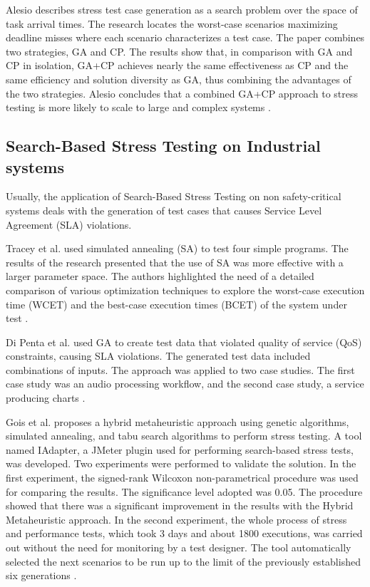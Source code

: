 \documentclass{report}
\begin{document}
Alesio describes stress test case generation as a search problem over the space of task arrival times. The research locates the  worst-case scenarios maximizing deadline misses where each scenario characterizes a test case. The paper combines two strategies, GA and CP. The results show that, in comparison with GA and CP in isolation, GA+CP achieves nearly the same effectiveness as CP and the same efficiency and solution diversity as GA, thus combining the advantages of the two strategies. Alesio concludes that a combined GA+CP approach to stress testing is more likely to scale to large and complex systems \cite{Alesio2015}.

\subsection{Search-Based Stress Testing on Industrial systems}

Usually, the application of Search-Based Stress Testing on non safety-critical systems deals with the generation of test cases that causes Service Level Agreement (SLA) violations.


Tracey et al. \cite{Tracey1998} used simulated annealing (SA) to test four
simple programs. The results of the research presented that the use of SA was more effective with a larger parameter space. The authors highlighted the need of a detailed comparison of various optimization techniques to explore the worst-case execution time (WCET) and the best-case execution times (BCET) of the system under test \cite{Tracey1998}.

Di Penta et al. \cite{Penta2007} used GA to create test data that violated quality of service (QoS) constraints, causing SLA violations. The generated test data included combinations of inputs. The approach was applied to two case studies. The first case study was an audio processing workflow, and the second case study, a service producing charts \cite{Penta2007}.


Gois et al. proposes a hybrid metaheuristic approach using genetic algorithms, simulated annealing, and tabu search algorithms to perform stress testing. A tool named IAdapter, a JMeter plugin used for performing search-based stress tests, was developed. Two experiments were performed to validate the solution. In the first experiment, the signed-rank Wilcoxon non-parametrical procedure was used for comparing the results. The significance level adopted was 0.05. The procedure showed that there was a significant improvement in the results with the Hybrid Metaheuristic approach.
In the second experiment, the whole process of stress and performance tests, which took 3 days and about 1800 executions, was carried out without the need for monitoring by a test designer. The tool automatically selected the next scenarios to be run up to the limit of the previously established six generations \cite{Gois2016}.
\end{document}
